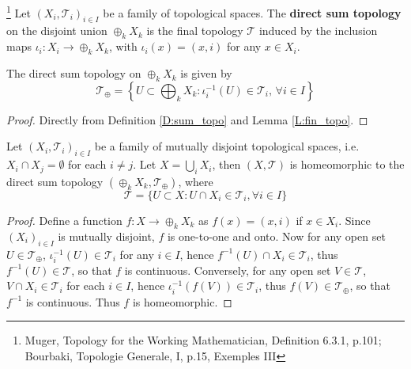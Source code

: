 \begin{definition} \label{D:sum_topo}
  \footnote{Muger, Topology for the Working Mathematician, Definition 6.3.1, 
    p.101; Bourbaki, Topologie Generale, I, p.15, Exemples III }
  Let $(X_i,\mathcal{T}_i)_{i\in I}$ be a family of topological spaces. The
  \textbf{direct sum topology} 
  on the disjoint union $\oplus_k X_k$ is the final topology $\mathcal{T}$
  induced by the inclusion maps $\iota_i:X_i\to \oplus_k X_k$, with 
  $\iota_i(x)=(x,i)$ for any $x\in X_i$.
\end{definition}

\begin{lemma}
  The direct sum topology on $\oplus_k X_k$ is given by
  \[
    \mathcal{T}_{\oplus} 
      = \left\{ 
          U\subset \bigoplus_k X_k: \iota_i^{-1}(U)\in\mathcal{T}_i, 
          \, \forall i\in I 
        \right\}
  \]
\end{lemma}
\begin{proof}
  Directly from Definition \ref{D:sum_topo} and Lemma \ref{L:fin_topo}.
\end{proof}

\begin{lemma} \label{L:sum_topo_homeo}
  Let $(X_i,\mathcal{T}_i)_{i\in I}$ be a family of mutually disjoint topological 
  spaces, i.e. $X_i\cap X_j=\emptyset$ for each $i\neq j$.
  Let $X=\bigcup_i X_i$,
  then $(X,\mathcal{T})$ is homeomorphic to the direct sum topology
  $(\oplus_k X_k, \mathcal{T}_{\oplus})$, where
  \[
    \mathcal{T} = \{ U\subset X: U\cap X_i\in \mathcal{T}_i, \forall i\in I \}
  \]
\end{lemma}
\begin{proof}
  Define a function $f:X\to \oplus_k X_k$ as $f(x)=(x,i)$ if $x\in X_i$.
  Since $(X_i)_{i\in I}$ is mutually disjoint, $f$ is one-to-one and onto.
  Now for any open set $U\in \mathcal{T}_{\oplus}$,
  $\iota_i^{-1}(U)\in\mathcal{T}_i$ for any $i\in I$, 
  hence $f^{-1}(U)\cap X_i \in\mathcal{T}_i$,
  thus $f^{-1}(U)\in\mathcal{T}$, so that $f$ is continuous.
  Conversely, for any open set $V\in\mathcal{T}$, $V\cap X_i\in \mathcal{T}_i$
  for each $i\in I$, hence $\iota_i^{-1}(f(V))\in\mathcal{T}_i$, 
  thus $f(V)\in\mathcal{T}_{\oplus}$, so that $f^{-1}$ is continuous.
  Thus $f$ is homeomorphic.
\end{proof}

